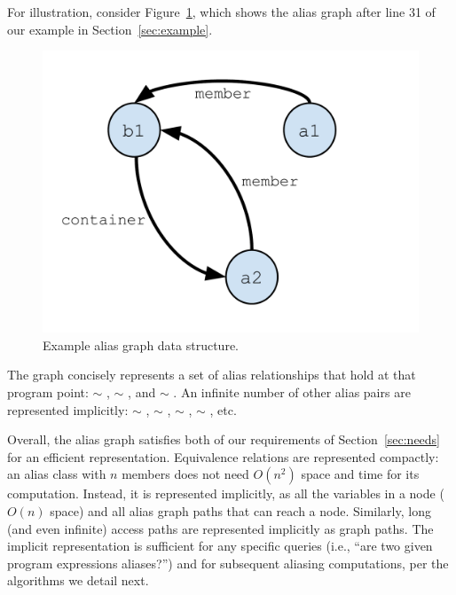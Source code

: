 For
illustration, consider Figure~\ref{fig/alias-graph}, which shows the
alias graph after line 31 of our example in Section~\ref{sec:example}.


\begin{figure}[h]
  \begin{minipage}[b]{\linewidth}
    \centering
    \includegraphics[trim={13mm 15mm 10mm 10mm},clip,width=0.7\linewidth]{assets/must-data/alias-graph.pdf}
  \end{minipage}
  \caption{Example alias graph data structure.}
    \label{fig/alias-graph}
\end{figure}

The graph concisely represents a set of alias relationships that hold
at that program point:  $\sim$ ,
 $\sim$ , and  $\sim$ . An
infinite number of other alias pairs are represented implicitly:
 $\sim$ ,   $\sim$
,  $\sim$ ,
 $\sim$ , etc.

Overall, the alias graph satisfies both of our requirements of
Section~\ref{sec:needs} for an efficient representation.  Equivalence
relations are represented compactly: an alias class with $n$ members
does not need $O(n^2)$ space and time for its computation.  Instead,
it is represented implicitly, as all the variables in a node ($O(n)$
space) and all alias graph paths that can reach a node.
Similarly, long (and even infinite) access paths are represented
implicitly as graph paths. The implicit representation is sufficient
for any specific queries (i.e., ``are two given program expressions
aliases?'') and for subsequent aliasing computations, per the algorithms
we detail next.

